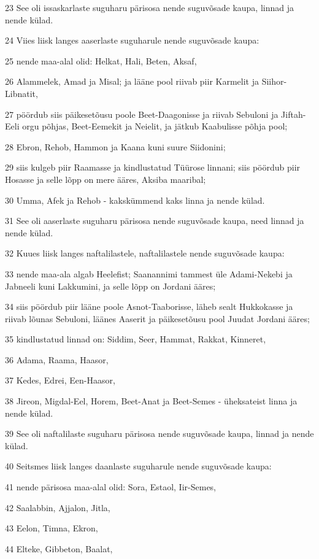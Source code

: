 \par 23 See oli issaskarlaste suguharu pärisosa nende suguvõsade kaupa, linnad ja nende külad.
\par 24 Viies liisk langes aaserlaste suguharule nende suguvõsade kaupa:
\par 25 nende maa-alal olid: Helkat, Hali, Beten, Aksaf,
\par 26 Alammelek, Amad ja Misal; ja lääne pool riivab piir Karmelit ja Siihor-Libnatit,
\par 27 pöördub siis päikesetõusu poole Beet-Daagonisse ja riivab Sebuloni ja Jiftah-Eeli orgu põhjas, Beet-Eemekit ja Neielit, ja jätkub Kaabulisse põhja pool;
\par 28 Ebron, Rehob, Hammon ja Kaana kuni suure Siidonini;
\par 29 siis kulgeb piir Raamasse ja kindlustatud Tüürose linnani; siis pöördub piir Hosasse ja selle lõpp on mere ääres, Aksiba maaribal;
\par 30 Umma, Afek ja Rehob - kakskümmend kaks linna ja nende külad.
\par 31 See oli aaserlaste suguharu pärisosa nende suguvõsade kaupa, need linnad ja nende külad.
\par 32 Kuues liisk langes naftalilastele, naftalilastele nende suguvõsade kaupa:
\par 33 nende maa-ala algab Heelefist; Saanannimi tammest üle Adami-Nekebi ja Jabneeli kuni Lakkumini, ja selle lõpp on Jordani ääres;
\par 34 siis pöördub piir lääne poole Asnot-Taaborisse, läheb sealt Hukkokasse ja riivab lõunas Sebuloni, läänes Aaserit ja päikesetõusu pool Juudat Jordani ääres;
\par 35 kindlustatud linnad on: Siddim, Seer, Hammat, Rakkat, Kinneret,
\par 36 Adama, Raama, Haasor,
\par 37 Kedes, Edrei, Een-Haasor,
\par 38 Jireon, Migdal-Eel, Horem, Beet-Anat ja Beet-Semes - üheksateist linna ja nende külad.
\par 39 See oli naftalilaste suguharu pärisosa nende suguvõsade kaupa, linnad ja nende külad.
\par 40 Seitsmes liisk langes daanlaste suguharule nende suguvõsade kaupa:
\par 41 nende pärisosa maa-alal olid: Sora, Estaol, Iir-Semes,
\par 42 Saalabbin, Ajjalon, Jitla,
\par 43 Eelon, Timna, Ekron,
\par 44 Elteke, Gibbeton, Baalat,
